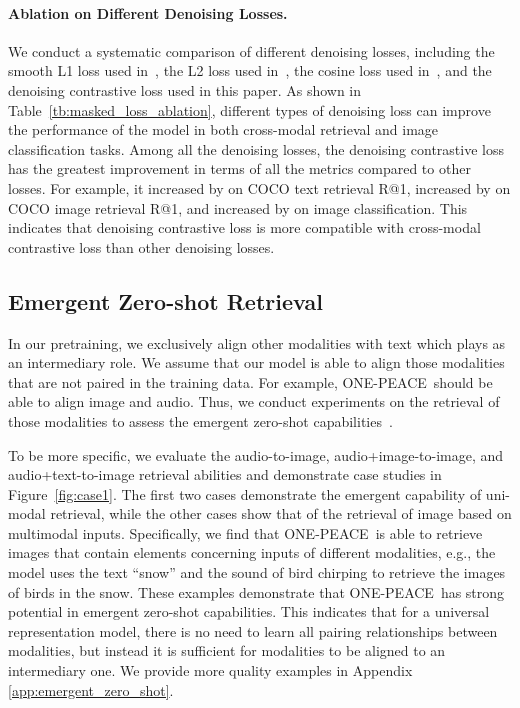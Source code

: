 \documentclass{article}
\newcommand{\onepeace}{ONE-PEACE\xspace}
\begin{document}
\paragraph{Ablation on Different Denoising Losses.}
We conduct a systematic comparison of different denoising losses, including the smooth L1 loss used in~\cite{data2vec,maskclip}, the L2 loss used in~\cite{data2vec2,dbot}, the cosine loss used in~\cite{mvp,eva,caev2}, and the denoising contrastive loss used in this paper. 
As shown in Table~\ref{tb:masked_loss_ablation}, different types of denoising loss can improve the performance of the model in both cross-modal retrieval and image classification tasks. 
Among all the denoising losses, the denoising contrastive loss has the greatest improvement in terms of all the metrics compared to other losses. For example, it increased by  on COCO text retrieval R@1, increased by  on COCO image retrieval R@1, and increased by  on image classification. 
This indicates that denoising contrastive loss is more compatible with cross-modal contrastive loss than other denoising losses.







\subsection{Emergent Zero-shot Retrieval}
In our pretraining, we exclusively align other modalities with text which plays as an intermediary role. We assume that our model is able to align those modalities that are not paired in the training data. For example, \onepeace~should be able to align image and audio. Thus, we conduct experiments on the retrieval of those modalities to assess the emergent zero-shot capabilities~\cite{imagebind}. 

To be more specific, we evaluate the audio-to-image, audio+image-to-image, and audio+text-to-image retrieval abilities and demonstrate case studies in Figure~\ref{fig:case1}. 
The first two cases demonstrate the emergent capability of uni-modal retrieval, while the other cases show that of the retrieval of image based on multimodal inputs. 
Specifically, we find that \onepeace~is able to retrieve images that contain elements concerning inputs of different modalities, e.g., the model uses the text ``snow'' and the sound of bird chirping to retrieve the images of birds in the snow. These examples demonstrate that \onepeace~has strong potential in emergent zero-shot capabilities. This indicates that for a universal representation model, there is no need to learn all pairing relationships between modalities, but instead it is sufficient for modalities to be aligned to an intermediary one. 
We provide more quality examples in Appendix \ref{app:emergent_zero_shot}.
\end{document}
